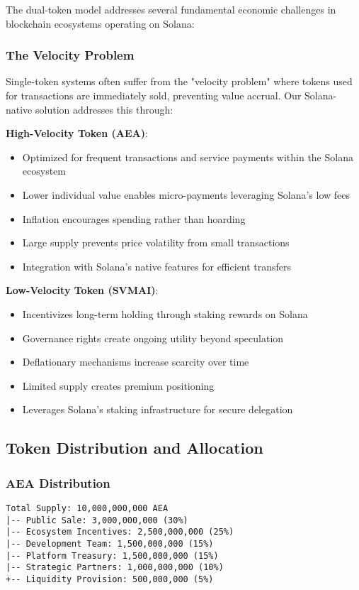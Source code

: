 \documentclass[12pt,a4paper]{article}
\begin{document}
The dual-token model addresses several fundamental economic challenges in blockchain ecosystems operating on Solana:

\subsubsection{The Velocity Problem}

Single-token systems often suffer from the "velocity problem" where tokens used for transactions are immediately sold, preventing value accrual. Our Solana-native solution addresses this through:

\textbf{High-Velocity Token (AEA)}:
\begin{itemize}
\item Optimized for frequent transactions and service payments within the Solana ecosystem
\item Lower individual value enables micro-payments leveraging Solana's low fees
\item Inflation encourages spending rather than hoarding
\item Large supply prevents price volatility from small transactions
\item Integration with Solana's native features for efficient transfers
\end{itemize}

\textbf{Low-Velocity Token (SVMAI)}:
\begin{itemize}
\item Incentivizes long-term holding through staking rewards on Solana
\item Governance rights create ongoing utility beyond speculation
\item Deflationary mechanisms increase scarcity over time
\item Limited supply creates premium positioning
\item Leverages Solana's staking infrastructure for secure delegation
\end{itemize}

\subsection{Token Distribution and Allocation}

\subsubsection{AEA Distribution}

\begin{verbatim}
Total Supply: 10,000,000,000 AEA
|-- Public Sale: 3,000,000,000 (30%)
|-- Ecosystem Incentives: 2,500,000,000 (25%)
|-- Development Team: 1,500,000,000 (15%)
|-- Platform Treasury: 1,500,000,000 (15%)
|-- Strategic Partners: 1,000,000,000 (10%)
+-- Liquidity Provision: 500,000,000 (5%)
\end{verbatim}
\end{document}

